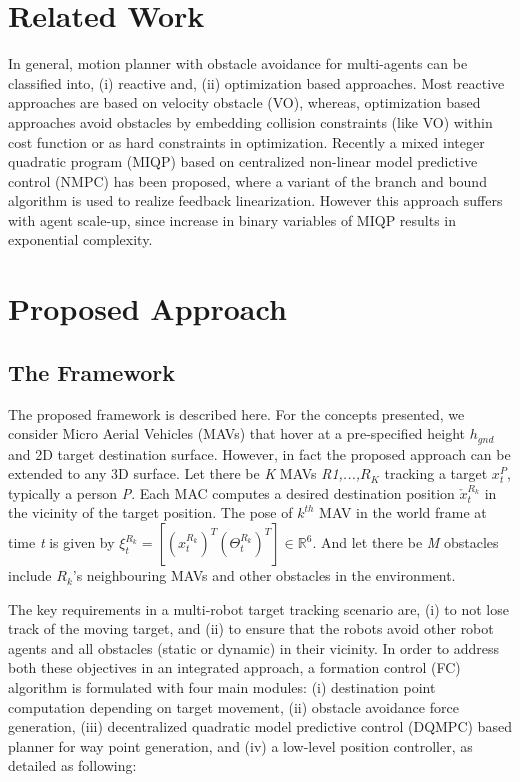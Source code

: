 \documentclass[12pt]{article}
\begin{document}
\section{Related Work}
In general, motion planner with obstacle avoidance for multi-agents can be classified into, (i) reactive and, (ii) optimization based approaches. Most reactive approaches are based on velocity obstacle (VO), whereas, optimization based approaches avoid obstacles by embedding collision constraints (like VO) within cost function or as hard constraints in optimization. Recently a mixed integer quadratic program (MIQP) based on centralized non-linear model predictive control (NMPC) \cite{fukushima2013model} has been proposed, where a variant of the branch and bound algorithm is used to realize feedback linearization. However this approach suffers with agent scale-up, since increase in binary variables of MIQP results in exponential complexity. 

\section{Proposed Approach}
\subsection{The Framework}
The proposed framework is described here. For the concepts presented, we consider Micro Aerial Vehicles (MAVs) that hover at a pre-specified height $h_{gnd}$ and 2D target destination surface. However, in fact the proposed approach can be extended to any 3D surface. Let there be \emph{K} MAVs \emph{R1,...,$R_{K}$} tracking a target $x_{t}^{P}$, typically a person \emph{P}. Each MAC computes a desired destination position $\check{x}_{t}^{R_{k}}$ in the vicinity of the target position. The pose of $k^{th}$ MAV in the world frame at time \emph{t} is given by $\xi_{t}^{R_{k}} = [(x_{t}^{R_{k}})^{T} (\Theta_{t}^{R_{k}})^{T}] \in \mathbb{R}^{6}$. And let there be \emph{M} obstacles include $R_{k}$'s neighbouring MAVs and other obstacles in the environment.

The key requirements in a multi-robot target tracking scenario are, (i) to not lose track of the moving target, and (ii) to ensure that the robots avoid other robot agents and all obstacles (static or dynamic) in their vicinity. In order to address both these objectives in an integrated approach, a formation control (FC) algorithm is formulated with four main modules: (i) destination point computation depending on target movement, (ii) obstacle avoidance force generation, (iii) decentralized quadratic model predictive control (DQMPC) based planner for way point generation, and (iv) a low-level position controller, as detailed as following:
\end{document}
